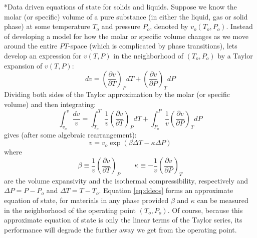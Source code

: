 \documentclass[11pt]{article}
\makeatletter
\theoremstyle{definition}
\renewcommand\subsection{\@startsection
	{subsection}{2}{0mm}
	{-0.05in}
	{0.5\baselineskip}
	{\normalfont\normalsize\bfseries}}
\makeatother
\begin{document}
\clearpage



\subsection*{Data driven equations of state for solids and liquids.}
Suppose we know the molar (or specific) volume of a pure substance (in either the liquid, gas or solid phase) at some temperature $T_{o}$ and pressure $P_{o}$, denoted by $v_{o}(T_{o},P_{o})$.
Instead of developing a model for how the molar or specific volume changes as we move around the entire $PT$-space (which is complicated by phase transitions), lets develop an expression for $v(T,P)$ in the neighborhood of $(T_{o},P_{o})$ by a Taylor expansion of $v(T,P)$:
\begin{equation}
  \displaystyle dv = \left(\frac{\partial v}{\partial T}\right)_{P}dT + \left(\frac{\partial v}{\partial P}\right)_{T}dP
\end{equation}
Dividing both sides of the Taylor approximation by the molar (or specific volume) and then integrating:
\begin{equation}
  \displaystyle \int_{v_{o}}^{v}\frac{dv}{v} = \int_{T_{o}}^{T} \frac{1}{v}\left(\frac{\partial v}{\partial T}\right)_{P}dT+
	\int_{P_{o}}^{P}\frac{1}{v}\left(\frac{\partial v}{\partial P}\right)_{T}dP
\end{equation}
gives (after some algebraic rearrangement):
\begin{equation}\label{eq:ddeos}
\displaystyle v = v_{o}\exp\left(\beta\Delta{T}-\kappa\Delta{P}\right)
\end{equation}
where
\begin{equation}
\beta\equiv\frac{1}{v}\left(\frac{\partial v}{\partial T}\right)_{P} \qquad \kappa \equiv -\frac{1}{v}\left(\frac{\partial v}{\partial P}\right)_{T}
\end{equation}
are the volume expansivity and the isothermal compressibility, respectively and $\Delta{P}=P-P_{o}$ and $\Delta{T}=T-T_{o}$.
Equation \eqref{eq:ddeos} forms an approximate equation of state, for materials in any phase provided $\beta$ and $\kappa$ can be measured in the
neighborhood of the operating point $(T_{o},P_{o})$. Of course, because this approximate equation of state is only the linear terms of the Taylor series,
its performance will degrade the further away we get from the operating point.
\end{document}
